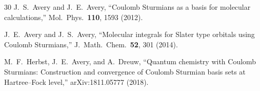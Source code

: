 \documentclass[aps,pra,twocolumn,superscriptaddress,longbibliography]{revtex4-2}
\begin{document}
\begin{thebibliography}{30}
J.~S.~Avery and J.~E.~Avery, ``Coulomb Sturmians as a basis for
  molecular calculations,'' Mol.\ Phys.\ \textbf{110}, 1593 (2012).

J.~E.~Avery and J.~S.~Avery, ``Molecular integrals for Slater type
  orbitals using Coulomb Sturmians,''
  J.~Math.\ Chem.\ \textbf{52}, 301 (2014).

M.~F.~Herbst, J.~E.~Avery, and A.~Dreuw, ``Quantum chemistry with
  Coulomb Sturmians: Construction and convergence of Coulomb Sturmian
  basis sets at Hartree--Fock level,'' arXiv:1811.05777 (2018).

\end{thebibliography}
\end{document}
